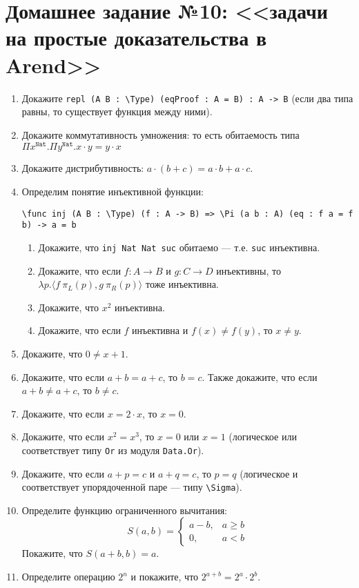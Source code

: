 \documentclass[10pt,a4paper,oneside]{article}
\begin{document}
\section*{Домашнее задание №10: <<задачи на простые доказательства в Arend>>}
\begin{enumerate}
\item Докажите \verb!repl (A B : \Type) (eqProof : A = B) : A -> B! (если два типа равны, то существует функция между ними).
\item Докажите коммутативность умножения: то есть обитаемость типа $\Pi x^\texttt{Nat}. \Pi y^\texttt{Nat}. x \cdot y = y \cdot x$
\item Докажите дистрибутивность: $a \cdot (b + c) = a \cdot b + a \cdot c$.
\item Определим понятие инъективной функции: 
\begin{verbatim}\func inj (A B : \Type) (f : A -> B) => \Pi (a b : A) (eq : f a = f b) -> a = b\end{verbatim}
\begin{enumerate}
\item Докажите, что \verb!inj Nat Nat suc! обитаемо --- т.е. \verb!suc! инъективна.
\item Докажите, что если $f: A \rightarrow B$ и $g: C \rightarrow D$ инъективны, то $\lambda p.\langle f\ \pi_L(p), g\ \pi_R(p)\rangle$ тоже
инъективна.
\item Докажите, что $x^2$ инъективна.
\item Докажите, что если $f$ инъективна и $f(x)\ne f(y)$, то $x \ne y$.
\end{enumerate}
\item Докажите, что $0 \ne x + 1$.
\item Докажите, что если $a + b = a + c$, то $b = c$. Также докажите, что если $a + b \ne a + c$, то $b \ne c$.
\item Докажите, что если $x = 2 \cdot x$, то $x = 0$.
\item Докажите, что если $x^2 = x^3$, то $x = 0$ или $x=1$ (логическое или соответствует типу \verb!Or! из модуля \verb!Data.Or!).
\item Докажите, что если $a + p = c$ и $a + q = c$, то $p = q$ (логическое и соответствует упорядоченной паре --- типу \verb!\Sigma!).
\item Определите функцию ограниченного вычитания: $$S(a,b) = \begin{cases}a - b, & a \ge b\\0, & a < b\end{cases}$$
Покажите, что $S(a+b,b)=a$.
\item Определите операцию $2^n$ и покажите, что $2^{a+b} = 2^a \cdot 2^b$.
\end{enumerate}
\end{document}
